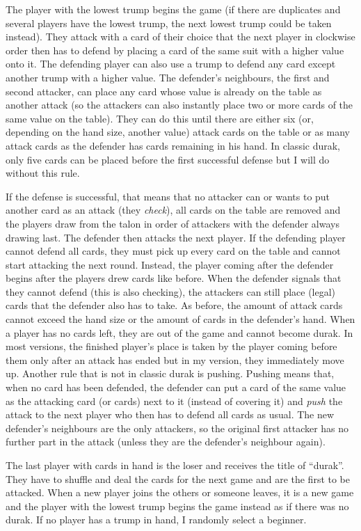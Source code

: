 \documentclass[a4paper,titlepage]{article}
\begin{document}
The player with the lowest trump begins the game (if there are duplicates and several players have the lowest trump, the next lowest trump could be taken instead). They attack with a card of their choice that the next player in clockwise order then has to defend by placing a card of the same suit with a higher value onto it. The defending player can also use a trump to defend any card except another trump with a higher value. The defender's neighbours, the first and second attacker, can place any card whose value is already on the table as another attack (so the attackers can also instantly place two or more cards of the same value on the table). They can do this until there are either six (or, depending on the hand size, another value) attack cards on the table or as many attack cards as the defender has cards remaining in his hand. In classic durak, only five cards can be placed before the first successful defense but I will do without this rule.

If the defense is successful, that means that no attacker can or wants to put another card as an attack (they \emph{check}), all cards on the table are removed and the players draw from the talon in order of attackers with the defender always drawing last. The defender then attacks the next player.
If the defending player cannot defend all cards, they must pick up every card on the table and cannot start attacking the next round. Instead, the player coming after the defender begins after the players drew cards like before. When the defender signals that they cannot defend (this is also checking), the attackers can still place (legal) cards that the defender also has to take. As before, the amount of attack cards cannot exceed the hand size or the amount of cards in the defender's hand.
When a player has no cards left, they are out of the game and cannot become durak. In most versions, the finished player's place is taken by the player coming before them only after an attack has ended but in my version, they immediately move up.
Another rule that is not in classic durak is pushing. Pushing means that, when no card has been defended, the defender can put a card of the same value as the attacking card (or cards) next to it (instead of covering it) and \emph{push} the attack to the next player who then has to defend all cards as usual. The new defender's neighbours are the only attackers, so the original first attacker has no further part in the attack (unless they are the defender's neighbour again).

The last player with cards in hand is the loser and receives the title of ``durak''. They have to shuffle and deal the cards for the next game and are the first to be attacked. When a new player joins the others or someone leaves, it is a new game and the player with the lowest trump begins the game instead as if there was no durak. If no player has a trump in hand, I randomly select a beginner. \medskip
\end{document}
